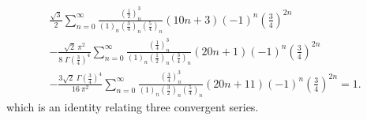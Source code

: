 \documentclass[12pt,a4paper]{amsart}
\begin{document}
\begin{multline}\nonumber
\frac{\sqrt{3}}{2} \sum_{n=0}^{\infty} \frac{\left( \frac12\right)_n^3}{(1)_n \left( \frac34\right)_n
\left( \frac54\right)_n}(10n+3)(-1)^n \left( \frac{3}{4} \right)^{2n}
\\ \nonumber - \frac{\sqrt{2} \: \pi^2}{8 \; \Gamma \! \left( \frac34 \right)^4}
\sum_{n=0}^{\infty} \frac{\left( \frac14\right)_n^3}{(1)_n \left( \frac12 \right)_n \left( \frac34\right)_n}(20n+1) (-1)^n \left( \frac{3}{4} \right)^{2n}
\\ \nonumber - \frac{3\sqrt{2} \: \Gamma \! \left( \frac34 \right)^4}{16 \: \pi^2}
\sum_{n=0}^{\infty} \frac{\left( \frac34\right)_n^3}{(1)_n
\left( \frac32 \right)_n\left( \frac54\right)_n}(20n+11)(-1)^n \left( \frac{3}{4} \right)^{2n}=1.
\end{multline}
which is an identity relating three convergent series.
\end{document}
